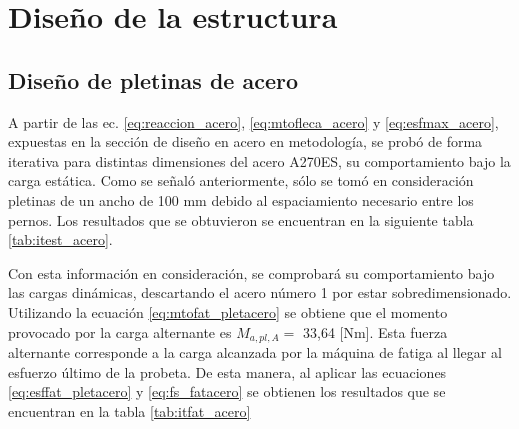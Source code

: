 \section{Diseño de la estructura}
\subsection{Diseño de pletinas de acero}
A partir de las ec. \ref{eq:reaccion_acero}, \ref{eq:mtofleca_acero} y \ref{eq:esfmax_acero}, expuestas en la sección de diseño en acero en metodología, se probó de forma iterativa para distintas dimensiones del acero A270ES, su comportamiento bajo la carga estática. Como se señaló anteriormente, sólo se tomó en consideración pletinas de un ancho de 100 mm debido al espaciamiento necesario entre los pernos. Los resultados que se obtuvieron se encuentran en la siguiente tabla \ref{tab:itest_acero}.

\begin{table}[h]
\centering
\caption{Resultados y factor de seguridad para distintas configuraciones de pletinas de acero.}
\label{tab:itest_acero}
\end{table}

Con esta información en consideración, se comprobará su comportamiento bajo las cargas dinámicas, descartando el acero número 1 por estar sobredimensionado. Utilizando la ecuación \ref{eq:mtofat_pletacero} se obtiene que el momento provocado por la carga alternante es $M_{a,pl,A} =$ 33,64 [Nm]. Esta fuerza alternante corresponde a la carga alcanzada por la máquina de fatiga al llegar al esfuerzo último de la probeta. De esta manera, al aplicar las ecuaciones \ref{eq:esffat_pletacero} y \ref{eq:fs_fatacero} se obtienen los resultados que se encuentran en la tabla \ref{tab:itfat_acero}

